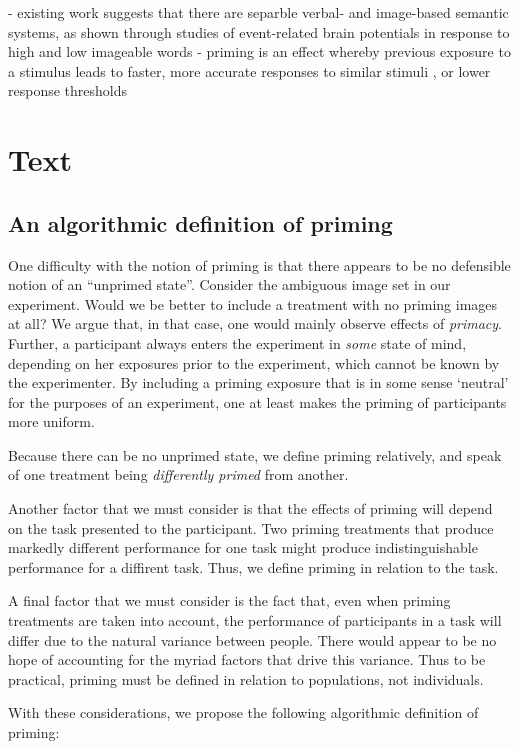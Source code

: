 \documentclass[a4paper]{report}
\begin{document}
- existing work suggests that there are separble verbal- and image-based
	semantic systems, as shown through studies of event-related brain 
	potentials in response to high and low imageable words \cite{Swaab200299} 
- priming is an effect whereby previous exposure to a stimulus leads to 
	faster, more accurate responses to similar stimuli \cite{Ghuman17062008}, 
	or lower response thresholds \cite{BJOP:BJOP1826}
	

\section*{Text}
\subsection*{An algorithmic definition of priming}
One difficulty with the notion of priming is that there appears to be no 
defensible notion of an ``unprimed state''.  Consider the ambiguous image set 
in our experiment.  Would we be better to include a treatment with no
priming images at all?  We argue that, in that case, one would mainly observe  
effects of \textit{primacy}.  
Further, a participant always enters the experiment in \textit{some} state of 
mind, depending on her exposures prior to the experiment, which cannot be 
known by the experimenter.  By including a priming exposure that is in some 
sense `neutral' for the purposes of an experiment, one at least makes the 
priming of participants more uniform.  

Because there
can be no unprimed state, we define priming relatively, and speak of one
treatment being \textit{differently primed} from another.

Another factor that we must consider is that the effects of priming will
depend on the task presented to the participant.  Two priming treatments that
produce markedly different performance for one task might produce 
indistinguishable performance for a diffirent task.  Thus, we define priming
in relation to the task.

A final factor that we must consider is the fact that, even when priming 
treatments are taken into account, the performance of participants in a task 
will differ due to the natural variance between people.  There would appear to
be no hope of accounting for the myriad factors that drive this variance.  Thus
to be practical, priming must be defined in relation to populations, not
individuals.

With these considerations, we propose the following algorithmic definition of
priming:
\end{document}
